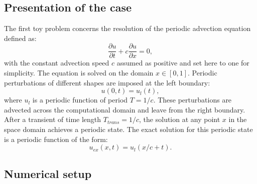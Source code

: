 
\subsection{Presentation of the case}

The first toy problem concerns the resolution of the periodic
advection equation defined as:
\begin{equation}
  \label{eq:convection}
  \frac{\partial u}{\partial t} + c \frac{\partial u}{\partial x} = 0,
\end{equation}
with the constant advection speed $c$ assumed as positive
and set here to one for simplicity. 
The equation is solved on the domain $x \in [0, 1]$. 
Periodic perturbations of different shapes are imposed at the left boundary:
\begin{equation}
   u(0, t) = u_l (t),
\end{equation}
where $u_l$ is a periodic function of period $T=1/c$.
These perturbations are advected across the computational 
domain and leave from the right boundary. After a transient of time length $T_{trans}=1/c$, 
the solution at any point $x$ in the space domain achieves a periodic state. 
The exact solution for this periodic state is a periodic function of the form:
\begin{equation}
    u_{ex}(x,t)=u_l(x/c+t).
\end{equation}

\subsection{Numerical setup}

